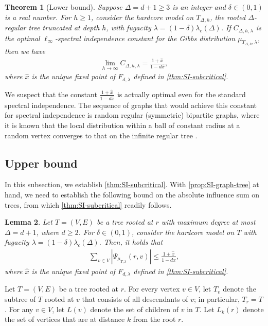 \documentclass[11pt]{article}
\theoremstyle{plain}
\newtheorem{theorem}{Theorem}[section]
\newtheorem{lemma}[theorem]{Lemma}
\theoremstyle{definition}
\theoremstyle{remark}
\begin{document}
\begin{theorem}[Lower bound]
	\label{thm:SI-lb}
	Suppose $\Delta = d+1 \ge 3$ is an integer and $\delta\in(0,1)$ is a real number.
	For $h \ge 1$, consider the hardcore model on $T_{\Delta,h}$, the rooted $\Delta$-regular tree truncated at depth $h$, with fugacity $\lambda = (1-\delta) \lambda_c(\Delta)$. 
	If $C_{\Delta,h,\lambda}$ is the optimal $\ell_\infty$-spectral independence constant for the Gibbs distribution $\mu_{T_{\Delta,h},\lambda}$, then we have
	\begin{align*}
		\lim_{h\to \infty} C_{\Delta,h,\lambda} = \frac{1+\hat{x}}{1-d\hat{x}},
	\end{align*}
	where $\hat{x}$ is the unique fixed point of $F_{d,\lambda}$ defined in \cref{thm:SI-subcritical}.
\end{theorem}


We suspect that the constant $\frac{1+\hat{x}}{1-d\hat{x}}$ is actually optimal even for the standard spectral independence. The sequence of graphs that would achieve this constant for spectral independence is random regular (symmetric) bipartite graphs, where it is known that the local distribution within a ball of constant radius at a random vertex converges to that on the infinite regular tree \cite{sly2012computational}.

\subsection{Upper bound}


In this subsection, we establish \cref{thm:SI-subcritical}.
With \cref{prop:SI-graph-tree} at hand, we need to establish the following bound on the absolute influence sum on trees, from which \cref{thm:SI-subcritical} readily follows.
\begin{lemma}\label{lem:sub-SI-tree}
    Let $T=(V,E)$ be a tree rooted at $r$ with maximum degree at most $\Delta = d+1$, where $d \ge 2$. 
    For $\delta\in (0,1)$, consider the hardcore model on $T$ with fugacity $\lambda = (1-\delta) \lambda_c(\Delta)$. 
    Then, it holds that
    \begin{align*}
        \sum_{v \in V} \left| \Psi_{\mu_{T,\lambda}}(r,v) \right|
        \le \frac{1+\hat{x}}{1-d\hat{x}},
    \end{align*}
    where $\hat{x}$ is the unique fixed point of $F_{d,\lambda}$ defined in \cref{thm:SI-subcritical}.
\end{lemma}


Let $T=(V,E)$ be a tree rooted at $r$. 
For every vertex $v\in V$, let $T_v$ denote the subtree of $T$ rooted at $v$ that consists of all descendants of $v$; in particular, $T_r = T$.
For any $v\in V$, let $L(v)$ denote the set of children of $v$ in $T$.
Let $L_k(r)$ denote the set of vertices that are at distance $k$ from the root $r$.
\end{document}
